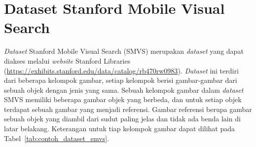 \section{Dataset Stanford Mobile Visual Search}
\label{sec:dataset_smvs}
\textit{Dataset} Stanford Mobile Visual Search (SMVS) merupakan \textit{dataset} yang dapat diakses melalui \textit{website} Stanford Libraries (\url{https://exhibits.stanford.edu/data/catalog/rb470rw0983}). \textit{Dataset} ini terdiri dari beberapa kelompok gambar, setiap kelompok berisi gambar-gambar dari sebuah objek dengan jenis yang sama. Sebuah kelompok gambar dalam \textit{dataset} SMVS memiliki beberapa gambar objek yang berbeda, dan untuk setiap objek terdapat sebuah gambar yang menjadi referensi. Gambar referensi berupa gambar sebuah objek yang diambil dari sudut paling jelas dan tidak ada benda lain di latar belakang. Keterangan untuk tiap kelompok gambar dapat dilihat pada Tabel~\ref{tab:contoh_dataset_smvs}.
